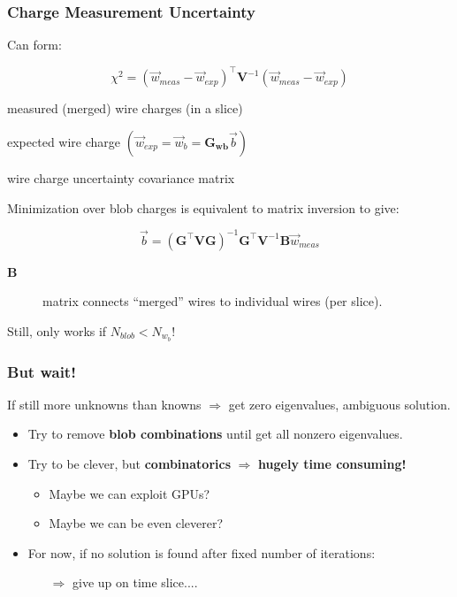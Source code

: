 \begin{frame}
  \frametitle{Charge Measurement Uncertainty}

  Can form:

  \[\chi^2 = (\vec{w}_{meas}-\vec{w}_{exp})^\intercal\mathbf{V}^{-1} (\vec{w}_{meas}-\vec{w}_{exp})\]

  \vspace{3mm}

  \begin{description}\footnotesize
  \item[$\vec{w}_{meas}$] measured (merged) wire charges (in a slice)
  \item[$\vec{w}_{exp}$] expected wire charge $(\vec{w}_{exp} = \vec{w}_b = \mathbf{G_{wb}}\vec{b})$
  \item[$\mathbf{V}$] wire charge uncertainty covariance matrix
  \end{description}

  \vspace{3mm}

  \footnotesize{Minimization over blob charges is equivalent to matrix inversion to
  give:}

  \[\vec{b} = (\mathbf{G}^\intercal\mathbf{V}\mathbf{G})^{-1}\mathbf{G}^\intercal\mathbf{V}^{-1}\mathbf{B}\vec{w}_{meas} \]

  \footnotesize
  \begin{description}
  \item[$\mathbf{B}$] matrix connects ``merged'' wires to individual wires (per slice).
  \end{description}

  \begin{center}
    Still, only works if $N_{blob} < N_{w_b}$!
  \end{center}
\end{frame}

\begin{frame}
  \frametitle{But wait!}

  If still more unknowns than knowns $\Rightarrow$ get zero eigenvalues, ambiguous solution.
  \begin{itemize}
  \item   Try to remove \textbf{blob combinations} until get all nonzero eigenvalues.
  \item   Try to be clever, but \textbf{combinatorics} $\Rightarrow$ \textbf{hugely time consuming!}  
    \begin{itemize}
    \item Maybe we can exploit GPUs?
    \item Maybe we can be even cleverer?
    \end{itemize}
  \item  For now, if no solution is found after fixed number of iterations:
    \begin{itemize}
    \item[$\Rightarrow$] give up on time slice....
    \end{itemize}
  \end{itemize}
\end{frame}


